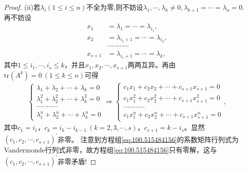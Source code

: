 \documentclass[../../main.tex]{subfiles}
\begin{document}
\begin{proof}
(ii)若$\lambda_i(1\leqslant  i\leqslant  n)$不全为零,则不妨设$\lambda_1,\cdots,\lambda_k\ne 0,\lambda_{k+1}=\cdots=\lambda_n=0$.再不妨设
\begin{align*}
x_1&=\lambda _1=\cdots =\lambda _{i_1},\\
x_2&=\lambda _{i_1+1}=\cdots =\lambda _{i_2},\\
&\cdots \cdots \cdots \cdots \\
x_{s + 1}&=\lambda _{i_s+1}=\cdots =\lambda _k,
\end{align*}
其中$1\leqslant  i_1,\cdots,i_s\leqslant  k$，并且$x_1,x_2,\cdots,x_{s + 1}$两两互异。再由$\mathrm{tr}(A^k)=0\ (1\leqslant  k\leqslant  n)$可得
\begin{align}
\begin{cases}
\lambda _1+\lambda _2+\cdots +\lambda _k=0\\
\lambda _{1}^{2}+\lambda _{2}^{2}+\cdots +\lambda _{k}^{2}=0\\
\cdots \cdots \cdots \cdots\\
\lambda _{1}^{n}+\lambda _{2}^{n}+\cdots +\lambda _{k}^{n}=0
\end{cases}\Rightarrow 
\begin{cases}
c_1x_1+c_2x_2+\cdots +c_{s + 1}x_{s + 1}=0\\
c_1x_{1}^{2}+c_2x_{2}^{2}+\cdots +c_{s + 1}x_{s + 1}^{2}=0\\
\cdots \cdots \cdots \cdots\\
c_1x_{1}^{n}+c_2x_{2}^{n}+\cdots +c_{s + 1}x_{s + 1}^{n}=0
\end{cases}, \label{eq:100.515484156}
\end{align}
其中$c_1 = i_1$，$c_k = i_k - i_{k - 1}\ (k = 2,3,\cdots,s)$，$c_{s + 1} = k - i_s$。显然$(c_1,c_2,\cdots,c_{s + 1})^\prime$非零。
注意到方程组\eqref{eq:100.515484156}的系数矩阵行列式为Vandermonde行列式非零，故方程组\eqref{eq:100.515484156}只有零解，这与$(c_1,c_2,\cdots,c_{s + 1})^\prime$非零矛盾! 

\end{proof}
\end{document}
